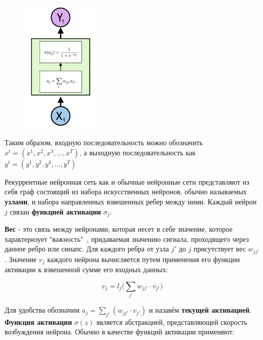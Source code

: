 \documentclass[a4paper,russian]{article}
\begin{document}
	\begin{figure}
		\centering
		\captionsetup{justification=centering}
		\includegraphics[height=65mm]{img/1.png}
	\end{figure}

	Таким образом, входную последовательность можно обозначить $x^t = (x^1, x^2, x^3, ... , x^T)$, а выходную последовательность как $y^t = (y^1, y^2, y^3, ... , y^T)$
	
	Рекуррентные нейронная сеть как и обычные нейронные сети представляют из себя граф состоящий из набора искусственных нейронов, обычно называемых \textbf{узлами}, и набора направленных взвешенных ребер между ними. Каждый нейрон $j$ связан \textbf{функцией активации} $\sigma_j$.
	
	\textbf{Вес} - это связь между нейронами, которая несет в себе значение, которое характеризует "важность"\ , придаваемая значению сигнала, проходящего через данное ребро или синапс. Для каждого ребра от узла $j'$ до $j$ присутствует вес $w_{jj'}$. Значение $v_j$ каждого нейрона вычисляется путем применения его функции активации к взвешенной сумме его входных данных: 
	
	$$v_j = l_j\bigg(\sum_{j'} w_{jj'} \cdot v_{j'}\bigg)$$
	
	Для удобства обозначим $a_j = \sum_{j'} (w_{jj'} \cdot v_{j'})$ и назавём \textbf{текущей активацией}. 
	\textbf{Функция активации} $\sigma(z)$ является абстракцией, представляющей скорость возбуждения нейрона. Обычно в качестве функций активации применяют:
	
\end{document}
